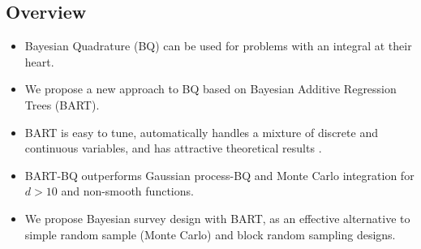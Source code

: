 \documentclass[a0,portrait]{a0poster}
\begin{document}
\begin{multicols}{3} %


\color{Navy} %

\section*{Overview}
	\begin{itemize}
		\item Bayesian Quadrature (BQ) can be used for problems with an integral at their heart. 
		\item We propose a new approach to BQ based on Bayesian Additive Regression Trees (BART). 
		\item BART is easy to tune, automatically handles a mixture of discrete and continuous variables, and has attractive theoretical results \cite{rockova2019theory,linero2018bayesian}. 
		\item BART-BQ outperforms Gaussian process-BQ and Monte Carlo integration for $d > 10$ and non-smooth functions.
		\item We propose Bayesian survey design with BART, as an effective alternative to simple random sample (Monte Carlo) and block random sampling designs.
	\end{itemize}
	
\color{Black} %



\end{multicols}
\end{document}
